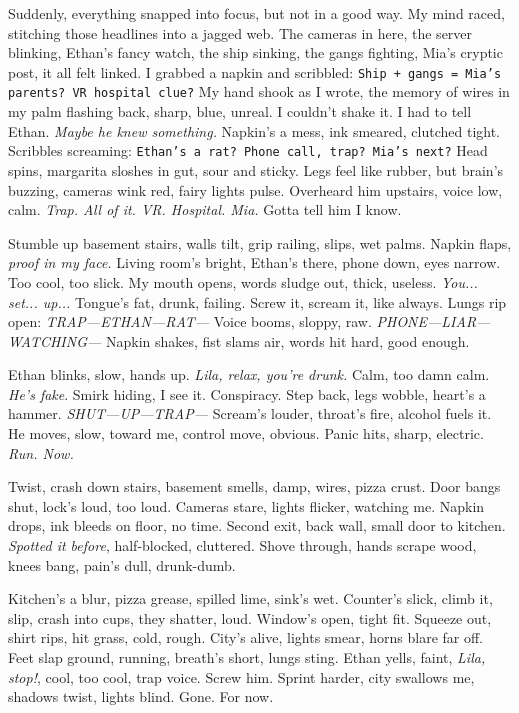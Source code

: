 \documentclass[12pt,oneside]{book} %
\newcommand{\note}[1]{\texttt{#1}}
\begin{document}
Suddenly, everything snapped into focus, but not in a good way. My mind raced, stitching those headlines into a jagged web. The cameras in here, the server blinking, Ethan’s fancy watch, the ship sinking, the gangs fighting, Mia’s cryptic post, it all felt linked. I grabbed a napkin and scribbled: \note{Ship + gangs = Mia’s parents? VR hospital clue?} My hand shook as I wrote, the memory of wires in my palm flashing back, sharp, blue, unreal. I couldn’t shake it. I had to tell Ethan. \textit{Maybe he knew something.} Napkin’s a mess, ink smeared, clutched tight. Scribbles screaming: \note{Ethan’s a rat? Phone call, trap? Mia’s next?} Head spins, margarita sloshes in gut, sour and sticky. Legs feel like rubber, but brain’s buzzing, cameras wink red, fairy lights pulse. Overheard him upstairs, voice low, calm. \textit{Trap. All of it. VR. Hospital. Mia.} Gotta tell him I know.

Stumble up basement stairs, walls tilt, grip railing, slips, wet palms. Napkin flaps, \textit{proof in my face.} Living room’s bright, Ethan’s there, phone down, eyes narrow. Too cool, too slick. My mouth opens, words sludge out, thick, useless. \textit{You... set... up...} Tongue’s fat, drunk, failing. Screw it, scream it, like always. Lungs rip open: \textit{TRAP—ETHAN—RAT—} Voice booms, sloppy, raw. \textit{PHONE—LIAR—WATCHING—} Napkin shakes, fist slams air, words hit hard, good enough.

Ethan blinks, slow, hands up. \textit{Lila, relax, you’re drunk.} Calm, too damn calm. \textit{He's fake}. Smirk hiding, I see it. Conspiracy. Step back, legs wobble, heart’s a hammer. \textit{SHUT—UP—TRAP—} Scream’s louder, throat’s fire, alcohol fuels it. He moves, slow, toward me, control move, obvious. Panic hits, sharp, electric. \textit{Run. Now.}

Twist, crash down stairs, basement smells, damp, wires, pizza crust. Door bangs shut, lock’s loud, too loud. Cameras stare, lights flicker, watching me. Napkin drops, ink bleeds on floor, no time. Second exit, back wall, small door to kitchen. \textit{Spotted it before}, half-blocked, cluttered. Shove through, hands scrape wood, knees bang, pain’s dull, drunk-dumb.

Kitchen’s a blur, pizza grease, spilled lime, sink’s wet. Counter’s slick, climb it, slip, crash into cups, they shatter, loud. Window’s open, tight fit. Squeeze out, shirt rips, hit grass, cold, rough. City’s alive, lights smear, horns blare far off. Feet slap ground, running, breath’s short, lungs sting. Ethan yells, faint, \textit{Lila, stop!}, cool, too cool, trap voice. Screw him. Sprint harder, city swallows me, shadows twist, lights blind. Gone. For now.
\end{document}
